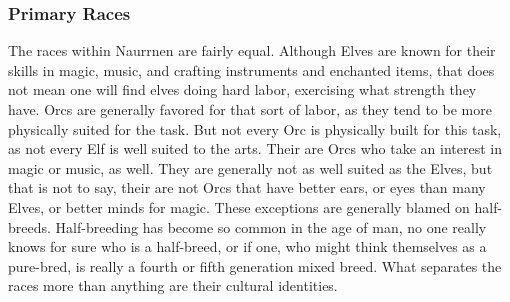 \documentclass[11pt]{article}
\begin{document}
\subsubsection{Primary Races}
\label{sec:org06ee576}
The races within Naurrnen are fairly equal. Although Elves are known for their skills in magic, music, and crafting instruments and enchanted items, that does not mean one will find elves doing hard labor, exercising what strength they have. Orcs are generally favored for that sort of labor, as they tend to be more physically suited for the task. But not every Orc is physically built for this task, as not every Elf is well suited to the arts. Their are Orcs who take an interest in magic or music, as well. They are generally not as well suited as the Elves, but that is not to say, their are not Orcs that have better ears, or eyes than many Elves, or better minds for magic. These exceptions are generally blamed on half-breeds. Half-breeding has become so common in the age of man, no one really knows for sure who is a half-breed, or if one, who might think themselves as a pure-bred, is really a fourth or fifth generation mixed breed. What separates the races more than anything are their cultural identities.
\end{document}
